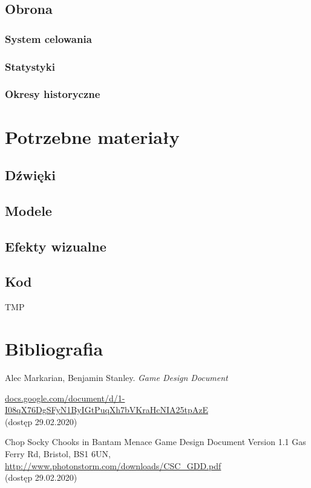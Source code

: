 \documentclass[a4paper,12pt, twoside, titlepage]{article}
\begin{document}
\subsection{Obrona}
\subsubsection{System celowania}
\subsubsection{Statystyki}
\subsubsection{Okresy historyczne}
 
\newpage
\section{Potrzebne materiały}
\subsection{Dźwięki}
\subsection{Modele}
\subsection{Efekty wizualne}
\subsection{Kod}
TMP
\cite{GDD-stanley}


\newpage
\section{Bibliografia}

\begingroup
\renewcommand{\section}[2]{}%
\begin{thebibliography}{}
	Alec Markarian, Benjamin Stanley.
	\emph{Game Design Document}

	\href{https://docs.google.com/document/d/1-I08qX76DgSFyN1ByIGtPuqXh7bVKraHcNIA25tpAzE}{docs.google.com/document/d/1-I08qX76DgSFyN1ByIGtPuqXh7bVKraHcNIA25tpAzE}\\
	(dostęp 29.02.2020)

	Chop Socky Chooks in Bantam Menace Game Design Document Version 1.1 Gas Ferry Rd, Bristol, BS1 6UN, \url{http://www.photonstorm.com/downloads/CSC_GDD.pdf}\\
	(dostęp 29.02.2020)

\end{thebibliography}
\endgroup
\end{document}
